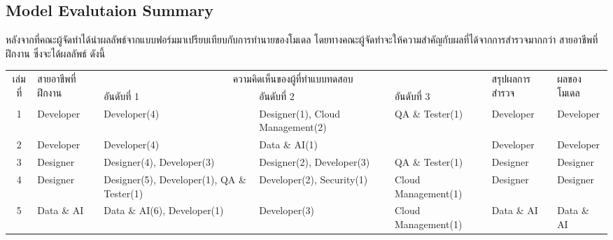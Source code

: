 \subsection{Model Evalutaion Summary}
หลังจากที่คณะผู้จัดทำได้นำผลลัพธ์จากแบบฟอร์มมาเปรียบเทียบกับการทำนายของโมเดล โดยทางคณะผู้จัดทำจะให้ความสำคัญกับผลที่ได้จากการสำรวจมากกว่า
สายอาชีพที่ฝึกงาน ซึ่งจะได้ผลลัพธ์ ดังนี้
\begin{table}[H]
    \begin{tabularx}{\textwidth}{|c|X|X|X|X|X|X|}
        \hline
        \multirow{2}{*}{เล่มที่} & \multirow{2}{*}{สายอาชีพที่ฝึกงาน} & \multicolumn{3}{c|}{ความคิดเห็นของผู้ที่ทำแบบทดสอบ}     & \multirow{2}{*}{สรุปผลการสำรวจ}                             & \multirow{2}{*}{ผลของโมเดล}                                                                                    \\ \cline{3-5}
                              &                                & อันดับที่ 1                                          & อันดับที่ 2                                                   & อันดับที่ 3                            &                                  &                                        \\ \hline
        1                     & Developer                      & Developer(4)                                     & Designer(1), Cloud Management(2)                          & QA \& Tester(1)                    & Developer                        & Developer                              \\ \hline
        2                     & Developer                      & Developer(4)                                     & Data \& AI(1)                                             &                                    & Developer                        & Developer                              \\ \hline
        3                     & Designer                       & Designer(4), Developer(3)                        & Designer(2), Developer(3)                                 & QA \& Tester(1)                    & Designer                         & Designer                               \\ \hline
        4                     & Designer                       & Designer(5), Developer(1), QA \& Tester(1)       & Developer(2), Security(1)                                 & Cloud Management(1)                & Designer                         & Designer                               \\ \hline
        5                     & Data \& AI                     & Data \& AI(6), Developer(1)                      & Developer(3)                                              & Cloud Management(1)                & Data \& AI                       & Data \& AI                             \\ \hline

\end{tabularx}
\end{table}
